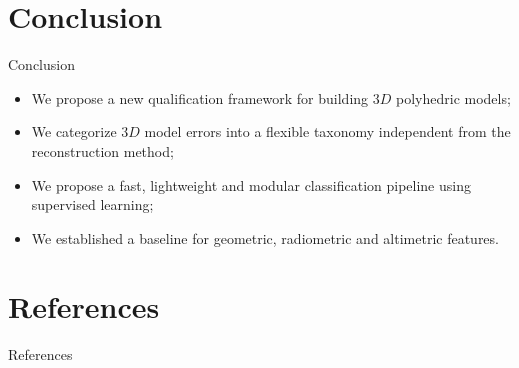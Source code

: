 \documentclass{beamer}
\begin{document}
    \section{Conclusion}
        \begin{frame}{Conclusion}
            \begin{itemize}[label=$\blacktriangleright$, font=\color{IGNGreen}]
                \item<1-> We propose a new qualification framework for building $3D$ polyhedric models;
                \item<2-> We categorize $3D$ model errors into a flexible taxonomy independent from the reconstruction method;
                \item<3-> We propose a fast, lightweight and modular classification pipeline using supervised learning;
                \item<4-> We established a baseline for geometric, radiometric and altimetric features.
            \end{itemize}
        \end{frame}
    \section*{References}
        \begin{frame}[allowframebreaks]{References}
            \printbibliography
        \end{frame}
    \appendix
\end{document}
